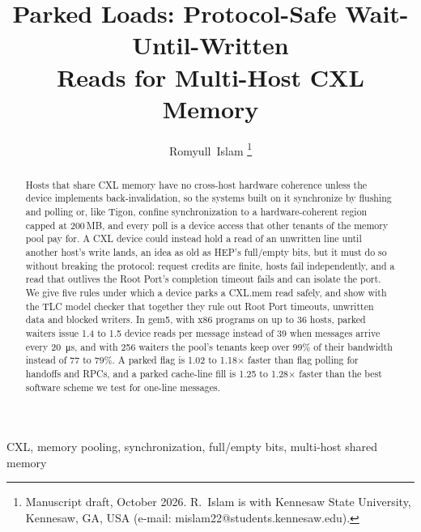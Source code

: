 \documentclass[journal]{IEEEtran}
\begin{document}
\title{Parked Loads: Protocol-Safe Wait-Until-Written\\Reads for Multi-Host CXL Memory}

\author{Romyull~Islam
\thanks{Manuscript draft, October 2026. R.~Islam is with Kennesaw State University, Kennesaw, GA,
USA (e-mail: mislam22@students.kennesaw.edu).}}%


\maketitle

\begin{abstract}
Hosts that share CXL memory have no cross-host hardware coherence unless the device implements
back-invalidation, so the systems built on it synchronize by flushing and polling or, like Tigon,
confine synchronization to a hardware-coherent region capped at 200\,MB, and
every poll is a device access that other tenants of the memory pool pay for. A CXL device could
instead hold a read of an unwritten line until another host's write lands, an idea as old as HEP's full/empty bits, but it must
do so without breaking the protocol: request credits are finite, hosts
fail independently, and a read that outlives the Root Port's completion timeout fails and can
isolate the port. We give five rules under which a device parks a CXL.mem read safely, and show
with the TLC model checker that together they rule out Root Port timeouts, unwritten data and
blocked writers. In gem5, with x86 programs on up to 36 hosts, parked waiters issue 1.4 to 1.5
device reads per message instead of 39 when messages arrive every \SI{20}{\micro\second}, and with 256 waiters the pool's tenants keep over 99\% of
their bandwidth instead of 77 to 79\%. A parked flag is 1.02 to 1.18$\times$ faster than flag
polling for handoffs and RPCs, and a parked cache-line fill is 1.25 to 1.28$\times$ faster than the
best software scheme we test for one-line messages.
\end{abstract}

\begin{IEEEkeywords}
CXL, memory pooling, synchronization, full/empty bits, multi-host shared memory
\end{IEEEkeywords}
\end{document}
